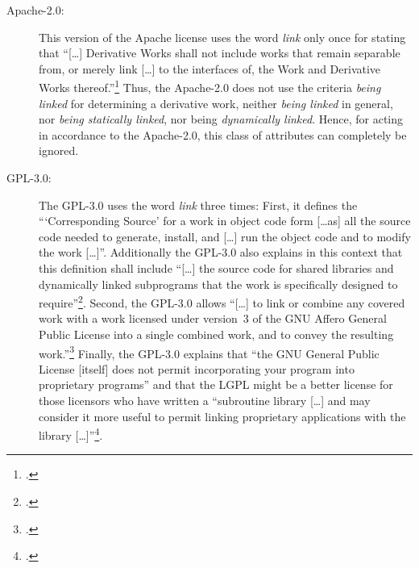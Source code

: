 \begin{description}

  \item[Apache-2.0:] This version of the Apache license uses the word
  \emph{link} only once for stating that \enquote{[\ldots] Derivative Works shall not
  include works that remain separable from, or merely link [\ldots] to the interfaces of, 
  the Work and Derivative Works thereof.}\footcite [cf.][\nopage wp.\
  §0]{Apl20OsiLicense2004a} Thus, the Apache-2.0 does not use the criteria \emph{being
  linked} for determining a derivative work, neither \emph{being linked} in
  general, nor \emph{being statically linked}, nor being \emph{dynamically
  linked}. Hence, for acting in accordance to the Apache-2.0, this class of attributes
  can completely be ignored.

  \item[GPL-3.0:] The GPL-3.0 uses the word \emph{link} three times: First, it
  defines the \enquote{\enquote{Corresponding Source} for a work in object code
  form [\ldots as] all the source code needed to generate, install, and [\ldots]
  run the object code and to modify the work [\ldots]}. Additionally the GPL-3.0
  also explains in this context that this definition shall include
  \enquote{[\ldots] the source code for shared libraries and dynamically linked
  subprograms that the work is specifically designed to
  require}\footcite[cf.][\nopage wp.\ §0]{Gpl30OsiLicense2007a}. Second, the
  GPL-3.0 allows \enquote{[\ldots] to link or combine any covered work with a
  work licensed under version~3 of the GNU Affero General Public License into a
  single combined work, and to convey the resulting work.}\footcite[cf.][\nopage
  wp.\ §13]{Gpl30OsiLicense2007a} Finally, the GPL-3.0 explains that
  \enquote{the GNU General Public License [itself] does not permit incorporating
  your program into proprietary programs} and that the LGPL might be a better
  license for those licensors who have written a \enquote{subroutine library
  [\ldots] and may consider it more useful to permit linking proprietary
  applications with the library [\ldots]}\footcite[cf.][\nopage wp.\ last
  parapgraph]{Gpl30OsiLicense2007a}.
  

\end{description}

